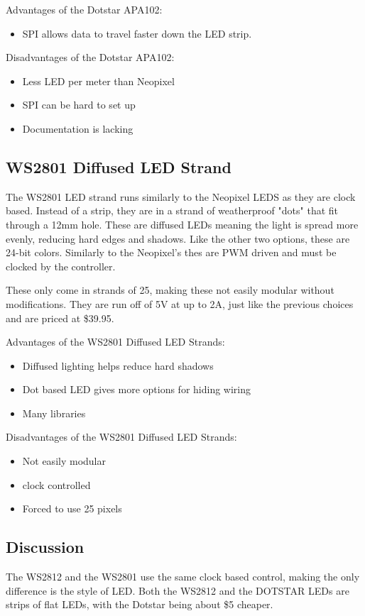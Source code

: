 	\vspace{5mm}
	\noindent Advantages of the Dotstar APA102:
	\begin{itemize}
		\item SPI allows data to travel faster down the LED strip.
	\end{itemize}
	Disadvantages of the Dotstar APA102:
	\begin{itemize}
		\item Less LED per meter than Neopixel
		\item SPI can be hard to set up
		\item Documentation is lacking
	\end{itemize}
	\subsection{WS2801 Diffused LED Strand}
	\noindent The WS2801 LED strand runs similarly to the Neopixel LEDS as they
	are clock based. Instead of a strip, they are in a strand of weatherproof
	"dots" that fit through a 12mm hole\cite[Pg 7]{strand}. These are diffused
	LEDs meaning the light is spread more evenly, reducing hard edges and
	shadows. Like the other two options, these are 24-bit colors. Similarly to
	the Neopixel's thes are PWM driven and must be clocked by the controller.

	\vspace{5mm}
	\noindent These only come in strands of 25, making these not easily modular without
	modifications. They are run off of 5V at up to 2A, just like the previous
	choices and are priced at \$39.95.

	\vspace{5mm}
	\noindent Advantages of the WS2801 Diffused LED Strands:
	\begin{itemize}
		\item Diffused lighting helps reduce hard shadows
		\item Dot based LED gives more options for hiding wiring
		\item Many libraries
	\end{itemize}
	Disadvantages of the WS2801 Diffused LED Strands:
	\begin{itemize}
		\item Not easily modular
		\item clock controlled
		\item Forced to use 25 pixels
	\end{itemize}
	\subsection{Discussion}
	The WS2812 and the WS2801 use the same clock based control, making the only
	difference is the style of LED. Both the WS2812 and the DOTSTAR LEDs are
	strips of flat LEDs, with the Dotstar being about \$5 cheaper.

